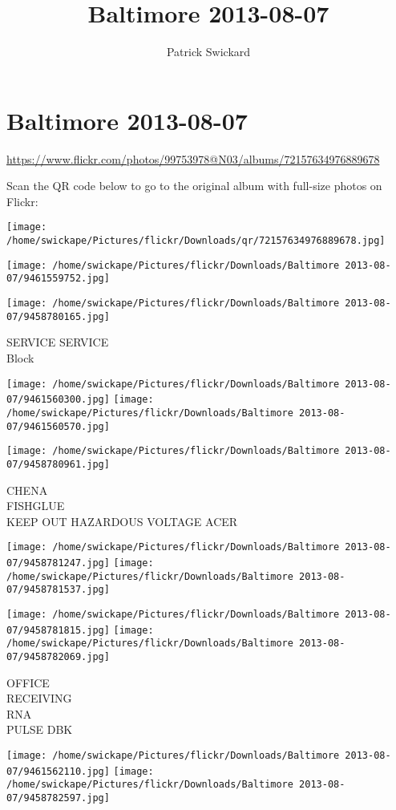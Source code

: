 \documentclass[10pt,letterpaper]{article}
\title{Baltimore 2013-08-07}
\author{Patrick Swickard}
\date{}
\begin{document}
\section*{Baltimore 2013-08-07}

\url{https://www.flickr.com/photos/99753978@N03/albums/72157634976889678}

Scan the QR code below to go to the original album with full-size photos on Flickr:

\texttt{[image: /home/swickape/Pictures/flickr/Downloads/qr/72157634976889678.jpg]}
\pagebreak

\texttt{[image: /home/swickape/Pictures/flickr/Downloads/Baltimore 2013-08-07/9461559752.jpg]}

\vspace{0.25in}
\texttt{[image: /home/swickape/Pictures/flickr/Downloads/Baltimore 2013-08-07/9458780165.jpg]}

SERVICE SERVICE\\
Block
\pagebreak

\texttt{[image: /home/swickape/Pictures/flickr/Downloads/Baltimore 2013-08-07/9461560300.jpg]}
\texttt{[image: /home/swickape/Pictures/flickr/Downloads/Baltimore 2013-08-07/9461560570.jpg]}

\vspace{0.25in}
\texttt{[image: /home/swickape/Pictures/flickr/Downloads/Baltimore 2013-08-07/9458780961.jpg]}

CHENA\\
FISHGLUE\\
KEEP OUT HAZARDOUS VOLTAGE ACER
\pagebreak

\texttt{[image: /home/swickape/Pictures/flickr/Downloads/Baltimore 2013-08-07/9458781247.jpg]}
\texttt{[image: /home/swickape/Pictures/flickr/Downloads/Baltimore 2013-08-07/9458781537.jpg]}

\texttt{[image: /home/swickape/Pictures/flickr/Downloads/Baltimore 2013-08-07/9458781815.jpg]}
\texttt{[image: /home/swickape/Pictures/flickr/Downloads/Baltimore 2013-08-07/9458782069.jpg]}

OFFICE\\
RECEIVING\\
RNA\\
PULSE DBK
\pagebreak

\texttt{[image: /home/swickape/Pictures/flickr/Downloads/Baltimore 2013-08-07/9461562110.jpg]}
\texttt{[image: /home/swickape/Pictures/flickr/Downloads/Baltimore 2013-08-07/9458782597.jpg]}
\end{document}

